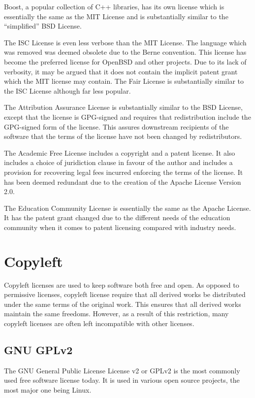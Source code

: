 \documentclass[12pt,letterpaper]{article}
\begin{document}
Boost, a popular collection of C++ libraries, has its own license which is essentially the same as the MIT License and is substantially similar to the ``simplified'' BSD License.

The ISC License is even less verbose than the MIT License. The language which was removed was deemed obsolete due to the Berne convention. This license has become the preferred license for OpenBSD and other projects. Due to its lack of verbosity, it may be argued that it does not contain the implicit patent grant which the MIT license may contain. The Fair License is substantially similar to the ISC License although far less popular.

The Attribution Assurance License is substantially similar to the BSD License, except that the license is GPG-signed and requires that redistribution include the GPG-signed form of the license. This assures downstream recipients of the software that the terms of the license have not been changed by redistributors.

The Academic Free License includes a copyright and a patent license. It also includes a choice of juridiction clause in favour of the author and includes a provision for recovering legal fees incurred enforcing the terms of the license. It has been deemed redundant due to the creation of the Apache License Version 2.0.

The Education Community License is essentially the same as the Apache License. It has the patent grant changed due to the different needs of the education community when it comes to patent licensing compared with industry needs.

\newpage
\section{Copyleft}

Copyleft licenses are used to keep software both free and open. As opposed to permissive licenses, copyleft license require that all derived works be distributed under the same terms of the original work. This ensures that all derived works maintain the same freedoms. However, as a result of this restriction, many copyleft licenses are often left incompatible with other licenses. \cite{copyleft}

\subsection{GNU GPLv2}

The GNU General Public License License v2 or GPLv2 is the most commonly used free software license today. It is used in various open source projects, the most major one being Linux.
\end{document}
